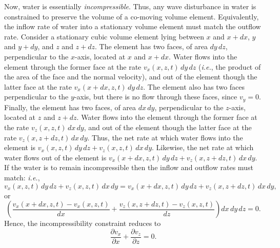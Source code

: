 Now, water is essentially {\em incompressible}. Thus, any wave disturbance in water is
constrained to preserve the volume of a co-moving volume element. Equivalently, the inflow  rate of water  into a stationary volume element must match the outflow rate.
Consider a stationary
cubic volume element lying between $x$ and $x+dx$, $y$ and $y+dy$, and $z$ and $z+dz$. The element has two faces, of area $dy\,dz$, perpendicular to the $x$-axis, located at
$x$ and $x+dx$. Water flows into the element through the former face
at the rate $v_x(x,z,t)\,dy\,dz$ ({\em i.e.}, the product of the area of the face and the
normal velocity), and out of the element though the
latter face at the rate $v_x(x+dx,z,t)\,dy\,dz$. The element also has two
faces perpendicular to the $y$-axis, but there is no flow through these faces, since
$v_y=0$. Finally, the element has two faces, of area $dx\,dy$, perpendicular to the $z$-axis, located at
$z$ and $z+dz$. Water flows into the element through the former face
at the rate $v_z(x,z,t)\,dx\,dy$, and out of the element though the
latter face at the rate $v_z(x,z+dz,t)\,dx\,dy$.
Thus, the net rate at which water flows into the element is $v_x(x,z,t)\,dy\,dz + v_z(x,z,t)\,dx\,dy$.
Likewise, the net rate at which water flows out of the element is
$v_x(x+dx,z,t)\,dy\,dz + v_z(x,z+dz,t)\,dx\,dy$. If the water is to remain incompressible
then the inflow and outflow rates must match: {\em i.e.}, 
\begin{equation}
v_x(x,z,t)\,dy\,dz + v_z(x,z,t)\,dx\,dy = v_x(x+dx,z,t)\,dy\,dz + v_z(x,z+dz,t)\,dx\,dy,
\end{equation}
or
\begin{equation}
\left(\frac{v_x(x+dx,z,t)-v_x(x,z,t)}{dx} + \frac{v_z(x,z+dz,t)-v_z(x,z,t)}{dz} \right)dx\,dy\,dz=0.
\end{equation}
Hence,  the incompressibility constraint reduces to
\begin{equation}\label{e9.76}
\frac{\partial v_x}{\partial x} + \frac{\partial v_z}{\partial z} = 0.
\end{equation}

